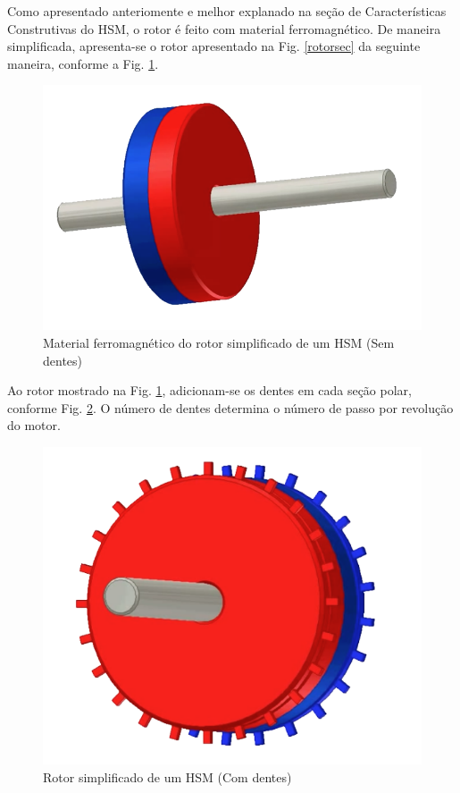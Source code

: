 	Como apresentado anteriomente e melhor explanado na seção de Características Construtivas do HSM, o rotor é feito com material ferromagnético. De maneira simplificada, apresenta-se o rotor apresentado na Fig. \ref{rotorsec} da seguinte maneira, conforme a Fig. \ref{rotor1}.
	
	\begin{figure}[!h]
		\centering 
		\includegraphics[scale=0.2]{images/hsm_operation/rotormag1}
		\caption{Material ferromagnético do rotor simplificado de um HSM (Sem dentes)}
		\label{rotor1}
	\end{figure}
	
	Ao rotor mostrado na Fig. \ref{rotor1}, adicionam-se os dentes em cada seção polar, conforme Fig. \ref{rotor2}. O número de dentes determina o número de passo por revolução do motor.
	
	\begin{figure}[!h]
		\centering 
		\includegraphics[scale=0.2]{images/hsm_operation/rotormag2}
		\caption{Rotor simplificado de um HSM (Com dentes)}
		\label{rotor2}
	\end{figure}
	
